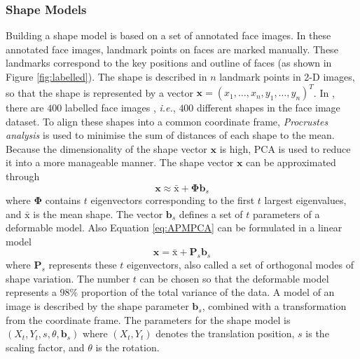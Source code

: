 \subsubsection{Shape Models}
Building a shape model is based on a set of annotated face images. In these annotated face images, landmark points on faces are marked manually. These landmarks correspond to the key positions and outline of faces (as shown in \mbox{Figure} \ref{fig:labelled}). The shape is described in $n$ landmark points in 2-D images, so that the shape is represented by a vector $\mathbf{x}=(x_1,\ldots ,x_n,y_1,\ldots,y_n)^T$. In \cite{Edwards1998}, there are $400$ labelled face images , \textit{i.e.}, $400$ different shapes in the face image dataset. To align these shapes into a common coordinate frame, \textit{Procrustes analysis} \cite{Goodall1991} is used to minimise the sum of distances of each shape to the mean. Because the dimensionality of the shape vector $\mathbf{x}$ is high, PCA is used to reduce it into a more manageable manner. The shape vector $\mathbf{x}$ can be approximated through
\begin{equation}
 \mathbf{x} \approx \bar{\mathrm{x}} + \mathbf{\Phi} \mathbf{b}_s
\label{eq:APMPCA}
\end{equation}
where $\mathbf{\Phi}$ contains $t$ eigenvectors corresponding to the first $t$ largest eigenvalues, and $\bar{\mathrm{x}}$ is the mean shape. The vector $\mathbf{b}_s$ defines a set of $t$ parameters of a deformable model. Also \mbox{Equation} \ref{eq:APMPCA} can be formulated in a linear model
\begin{equation}
 \mathbf{x} =\bar{\mathrm{x}} + \mathbf{P}_s \mathbf{b}_s
\end{equation}
where $\mathbf{P}_s$ represents these $t$ eigenvectors, also called a set of orthogonal modes of shape variation. The number $t$ can be chosen so that the deformable model represents a $98\%$ proportion of the total variance of the data. A model of an image is described by the shape parameter $\mathbf{b}_s$, combined with a transformation from the coordinate frame. The parameters for the shape model is $(X_t,Y_t,s,\theta,\mathbf{b}_s)$ where $(X_t,Y_t)$ denotes the translation position, $s$ is the scaling factor, and $\theta$ is the rotation.
